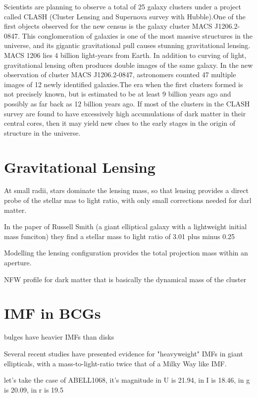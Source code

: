 Scientists are planning to observe a total of 25 galaxy clusters under a project called CLASH (Cluster Lensing and Supernova survey with Hubble).One of the first objects observed for the new census is the galaxy cluster MACS J1206.2-0847. This conglomeration of galaxies is one of the most massive structures in the universe, and its gigantic gravitational pull causes stunning gravitational lensing. MACS 1206 lies 4 billion light-years from Earth. In addition to curving of light, gravitational lensing often produces double images of the same galaxy. In the new observation of cluster MACS J1206.2-0847, astronomers counted 47 multiple images of 12 newly identified galaxies.The era when the first clusters formed is not precisely known, but is estimated to be at least 9 billion years ago and possibly as far back as 12 billion years ago. If most of the clusters in the CLASH survey are found to have excessively high accumulations of dark matter in their central cores, then it may yield new clues to the early stages in the origin of structure in the universe.


\section{Gravitational Lensing}

At small radii, stars dominate the lensing mass, so that lensing provides a direct probe of the stellar mas to light ratio, with only small corrections needed for darl matter.

In the paper of Russell Smith (a giant elliptical galaxy with a lightweight initial mass funciton) they find a stellar mass to light ratio of 3.01 plus minus 0.25

Modelling the lensing configuration provides the total projection mass within an aperture.

NFW profile for dark matter that is basically the dynamical mass of the cluster

\section{IMF in BCGs}

bulges have heavier IMFs than disks

Several recent studies have presented evidence for "heavyweight" IMFs in giant ellipticals, with a mass-to-light-ratio twice that of a Milky Way like IMF.

let's take the case of ABELL1068, it's magnitude in U is 21.94, in I is 18.46, in g is 20.09, in r is 19.5

